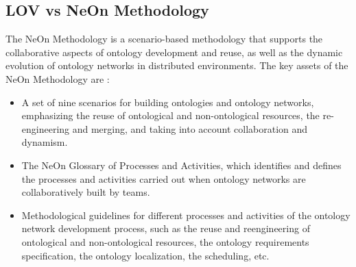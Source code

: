  \begin{table}[!htb]
\end{table}


\subsection{LOV vs NeOn Methodology}
\label{sec:Lovandneon}
The NeOn Methodology is a scenario-based methodology that supports the collaborative aspects of ontology development and reuse, as well as the dynamic evolution of ontology networks in distributed environments. The key assets of the NeOn Methodology are \cite{MC10}:
\begin{itemize}
\item  A set of nine scenarios for building ontologies and ontology networks, emphasizing the reuse of ontological and non-ontological resources, the re-engineering and merging, and taking into account collaboration and dynamism.
\item The NeOn Glossary of Processes and Activities, which identifies and defines the processes and activities carried out when ontology networks are collaboratively built by teams.
\item Methodological guidelines for different processes and activities of the ontology network development process, such as the reuse and reengineering of ontological and non-ontological resources, the ontology requirements specification, the ontology localization, the scheduling, etc.
\end{itemize}

